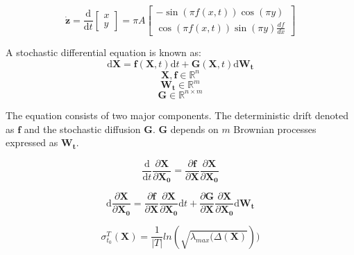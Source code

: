 \documentclass{juliacon}
\newcommand{\drv}{\textrm{d}}
\begin{document}
\begin{equation}
\dot{\mathbf{z}} =\frac{\drv}{\drv t}\begin{bmatrix}
    x \\
    y  \end{bmatrix}=\pi A\begin{bmatrix}
    -\sin(\pi f(x,t))\cos(\pi y) \\
    \cos(\pi f(x,t))\sin(\pi y)\frac{df}{dx}  \end{bmatrix} 
\end{equation}

A stochastic differential equation \cite{oksendal} is known as:
\begin{equation}
    \drv \mathbf{X}=\mathbf{f}(\mathbf{X},t) \drv t + \mathbf{G}(\mathbf{X},t) \drv \mathbf{W_t}
\end{equation}
\begin{equation*}
   \mathbf{X},\mathbf{f} \in \mathbb{R}^{n} 
\end{equation*}
\begin{equation*}
    \mathbf{W_t} \in \mathbb{R}^{m}
\end{equation*}
\begin{equation*}
    \mathbf{G} \in \mathbb{R}^{n \times m}
\end{equation*}

The equation consists of two major components. The deterministic drift denoted as $\mathbf{f}$ and the stochastic diffusion $\mathbf{G}$. $\mathbf{G}$ depends on $m$ Brownian processes expressed as $\mathbf{W_t}$.

\begin{equation}
    \frac{\drv}{\drv t} \frac{\partial \mathbf{X} }{\partial \mathbf{X_0}} = \frac{\partial \mathbf{f}}{\partial \mathbf{X}}\frac{\partial \mathbf{X}}{\partial \mathbf{X_0}}
\end{equation}

\begin{equation}
\drv \frac{\partial \mathbf{X}}{\partial \mathbf{X_0}}=
\frac{\partial \mathbf{f}}{\partial \mathbf{X}}
\frac{\partial \mathbf{X}}{\partial \mathbf{X_0}} \drv t
+
\frac{\partial \mathbf{G}}{\partial \mathbf{X}}
\frac{\partial \mathbf{X}}{\partial \mathbf{X_0}} \drv \mathbf{W_t}
\end{equation}

\begin{equation}
    \sigma_{t_0}^T(\mathbf{X})=\frac{1}{|T|}ln(\sqrt{\lambda_{max}(\Delta(\mathbf{X})}))
\end{equation}
\end{document}
